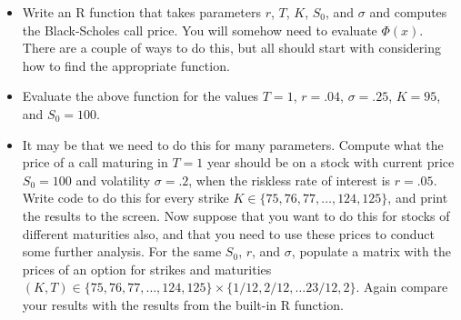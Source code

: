 \documentclass[12pt]{article}
\begin{document}
\begin{itemize}
\item Write an R function that takes parameters $r$, $T$, $K$,
  $S_0$, and $\sigma$ and computes the Black-Scholes call price. You
  will somehow need to evaluate $\Phi(x)$. There are a couple of ways
  to do this, but all should start with considering how to find the
  appropriate function.
\item Evaluate the above function for the values $T=1$, $r=.04$,
  $\sigma=.25$, $K=95$, and $S_0 = 100$.
\item It may be that we need to do this for many parameters.  Compute
  what the price of a call maturing in $T = 1$ year should be on a
  stock with current price $S_0 = 100$ and volatility $\sigma = .2$,
  when the riskless rate of interest is $r = .05$. Write code to do
  this for every strike $K \in \{75, 76, 77, \ldots, 124, 125\}$, and
  print the results to the screen.  Now suppose that you want to do
  this for stocks of different maturities also, and that you need to
  use these prices to conduct some further analysis. For the same
  $S_0$, $r$, and $\sigma$, populate a matrix with the prices of an
  option for strikes and maturities $(K,T) \in \{75, 76, 77, \ldots,
  124, 125\} \times \{1/12, 2/12, \ldots 23/12, 2\}$. Again compare
  your results with the results from the built-in R function.
\end{itemize}

 
\end{document}
